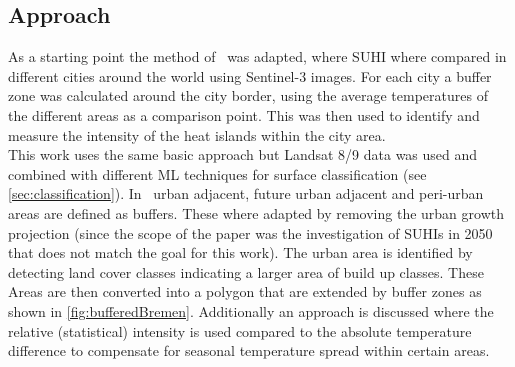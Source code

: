 \documentclass[12pt,a4paper, english,twoside]{article}
\begin{document}
    \subsection{Approach}
    As a starting point the method of~\cite{Sobrino2020} was adapted, where \gls{SUHI} where compared in different cities around the world using Sentinel-3 images. 
    For each city a buffer zone was calculated around the city border, using the average temperatures of the different areas as a comparison point.
    This was then used to identify and measure the intensity of the heat islands within the city area.\\ 
    This work uses the same basic approach but Landsat 8/9 data was used and combined with different \gls{ML} techniques for surface classification (see \cref{sec:classification}). 
    In~\cite{Sobrino2020} urban adjacent, future urban adjacent and peri-urban areas are defined as buffers.
    These where adapted by removing the urban growth projection (since the scope of the paper was the investigation of \glspl{SUHI} in 2050 that does not match the goal for this work).
    The urban area is identified by detecting land cover classes indicating a larger area of build up classes. 
    These Areas are then converted into a polygon that are extended by buffer zones as shown in \cref{fig:bufferedBremen}.
    Additionally an approach is discussed where the relative (statistical) intensity is used compared to the absolute temperature difference to compensate for seasonal temperature spread within certain areas.
    \newpage
\end{document}
